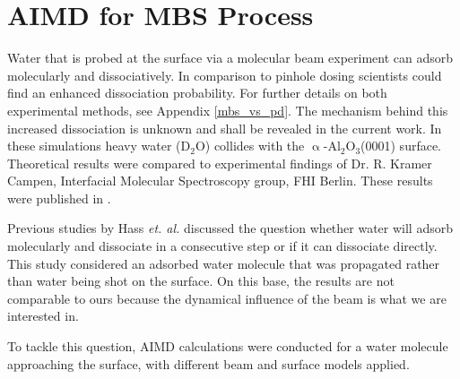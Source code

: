 \documentclass[11pt,DIV=13,BCOR=5mm,a4paper,headinclude]{scrbook}
\begin{document}
  
\section{AIMD for MBS Process}\label{sec_0001AIMD}
Water that is probed at the surface via a molecular beam experiment can adsorb molecularly and dissociatively.
In comparison to pinhole dosing scientists could find an enhanced dissociation probability.
For further details on both experimental methods, see Appendix \ref{mbs_vs_pd}.
The mechanism behind this increased dissociation is unknown and shall be revealed in the current work.
In these simulations heavy water (D$_2$O) collides with the $\upalpha$-Al$_{\text{2}}$O$_{\text{3}}$(0001) surface.
Theoretical results were compared to experimental findings of Dr. R. Kramer Campen, Interfacial Molecular Spectroscopy group, FHI Berlin.
These results were published in \cite{Heiden0001_2018}.


Previous studies by Hass \textit{et. al.}\cite{hass98,hass00} discussed the question whether water will adsorb molecularly and dissociate in a consecutive step or if it can dissociate directly.
This study considered an adsorbed water molecule that was propagated rather than water being shot on the surface.
On this base, the results are not comparable to ours because the dynamical influence of the beam is what we are interested in.


To tackle this question, AIMD calculations were conducted for a water molecule approaching the surface, with different beam and surface models applied.
\end{document}

